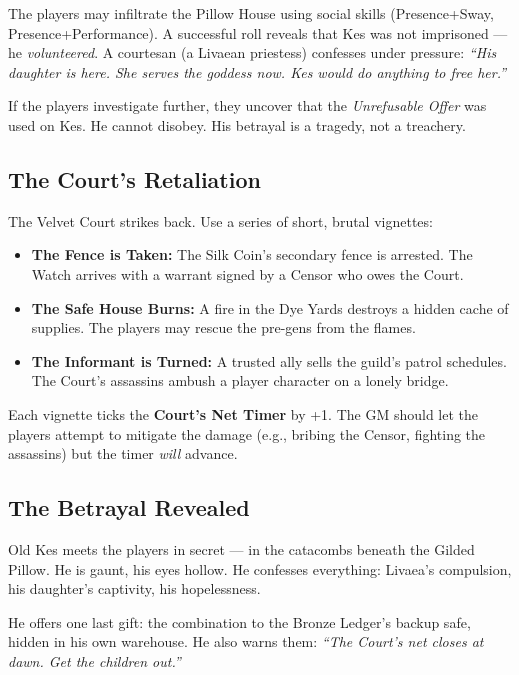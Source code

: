 \documentclass[10pt,twoside]{book}
\begin{document}
The players may infiltrate the Pillow House using social skills (Presence+Sway, Presence+Performance). A successful roll reveals that Kes was not imprisoned --- he \textit{volunteered}. A courtesan (a Livaean priestess) confesses under pressure: \textit{``His daughter is here. She serves the goddess now. Kes would do anything to free her.''}

If the players investigate further, they uncover that the \textit{Unrefusable Offer} was used on Kes. He cannot disobey. His betrayal is a tragedy, not a treachery.

\subsection{The Court's Retaliation}

The Velvet Court strikes back. Use a series of short, brutal vignettes:

\begin{itemize}
\item \textbf{The Fence is Taken:} The Silk Coin's secondary fence is arrested. The Watch arrives with a warrant signed by a Censor who owes the Court.
\item \textbf{The Safe House Burns:} A fire in the Dye Yards destroys a hidden cache of supplies. The players may rescue the pre-gens from the flames.
\item \textbf{The Informant is Turned:} A trusted ally sells the guild's patrol schedules. The Court's assassins ambush a player character on a lonely bridge.
\end{itemize}

Each vignette ticks the \textbf{Court's Net Timer } by +1. The GM should let the players attempt to mitigate the damage (e.g., bribing the Censor, fighting the assassins) but the timer \textit{will} advance.

\subsection{The Betrayal Revealed}

Old Kes meets the players in secret --- in the catacombs beneath the Gilded Pillow. He is gaunt, his eyes hollow. He confesses everything: Livaea's compulsion, his daughter's captivity, his hopelessness.

He offers one last gift: the combination to the Bronze Ledger's backup safe, hidden in his own warehouse. He also warns them: \textit{``The Court's net closes at dawn. Get the children out.''}
\end{document}
